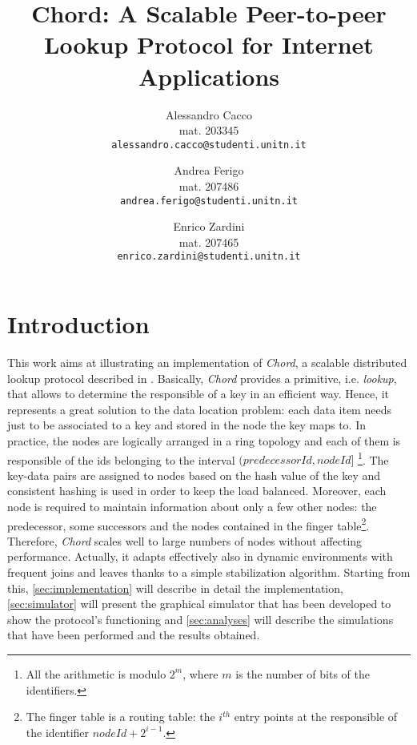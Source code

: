 \documentclass[11pt,twocolumn,letterpaper]{article}
\begin{document}
	
	\title{Chord: A Scalable Peer-to-peer Lookup Protocol for Internet Applications}
	
	\author{Alessandro Cacco\\
		mat. 203345\\
		{\tt\small alessandro.cacco@studenti.unitn.it}
		\and
		Andrea Ferigo\\
		mat. 207486\\
		{\tt\small andrea.ferigo@studenti.unitn.it}
		\and
		Enrico Zardini\\
		mat. 207465\\
		{\tt\small enrico.zardini@studenti.unitn.it}
	}
	\date{}
	\maketitle
	
	\section{Introduction}
	\label{sec:intro}
	This work aims at illustrating an implementation of \textit{Chord}, a scalable distributed lookup protocol described in \cite{chord}. Basically, \textit{Chord} provides a primitive, i.e. \textit{lookup}, that allows to determine the responsible of a key in an efficient way. Hence, it represents a great solution to the data location problem: each data item needs just to be associated to a key and stored in the node the key maps to. \newline 
	In practice, the nodes are logically arranged in a ring topology and each of them is responsible of the ids belonging to the interval $(predecessorId, nodeId]$ \footnote{All the arithmetic is modulo $2^m$, where $m$ is the number of bits of the identifiers.}. The key-data pairs are assigned to nodes based on the hash value of the key and consistent hashing is used in order to keep the load balanced. Moreover, each node is required to maintain information about only a few other nodes: the predecessor, some successors and the nodes contained in the finger table\footnote{The finger table is a routing table: the $i^{th}$ entry points at the responsible of the identifier $nodeId+2^{i-1}$.}. Therefore, \textit{Chord} scales well to large numbers of nodes without affecting performance. Actually, it adapts effectively also in dynamic environments with frequent joins and leaves thanks to a simple stabilization algorithm. \newline
	Starting from this, \cref{sec:implementation} will describe in detail the implementation, \cref{sec:simulator} will present the graphical simulator that has been developed to show the protocol's functioning and \cref{sec:analyses} will describe the simulations that have been performed and the results obtained. 
	
\end{document}

